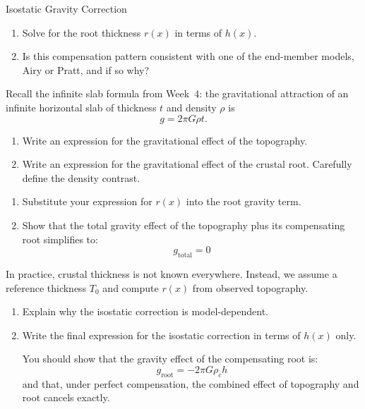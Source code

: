 \begin{activity}{Isostatic Gravity Correction}
\begin{questions}
\begin{enumerate}[label=\roman*]
        \item Solve for the root thickness $r(x)$ in terms of $h(x)$.
        \answerbox[3cm]

        \item Is this compensation pattern consistent with one of the end-member models, Airy or Pratt, and if so why?
        \answerbox[3cm]
    \end{enumerate}

    Recall the infinite slab formula from Week~4: the gravitational attraction of an infinite horizontal slab of thickness $t$ and density $\rho$ is
    \[
        g = 2\pi G \rho t .
    \]
    \begin{enumerate}[label=\roman*]
        \item Write an expression for the gravitational effect of the topography.
        \answerbox[3cm]

        \item Write an expression for the gravitational effect of the crustal root. Carefully define the density contrast.
        \answerbox[3cm]
    \end{enumerate}

    \begin{enumerate}[label=\roman*]
        \item Substitute your expression for $r(x)$ into the root gravity term.
        \answerbox[5cm]

        \item Show that the total gravity effect of the topography plus its compensating root simplifies to:
        \[
            g_{\text{total}} = 0
        \]
        \answerbox[5cm]
    \end{enumerate}

    In practice, crustal thickness is not known everywhere. Instead, we assume a reference thickness $T_0$ and compute $r(x)$ from observed topography.
    \begin{enumerate}[label=\roman*]
        \item Explain why the isostatic correction is model-dependent.
        \answerbox[3cm]

        \item Write the final expression for the isostatic correction in terms of $h(x)$ only.

        You should show that the gravity effect of the compensating root is:
        \[
            g_{\text{root}} = -2\pi G \rho_c h
        \]
        and that, under perfect compensation, the combined effect of topography and root cancels exactly.
        \answerbox[3cm]
    \end{enumerate}


\end{questions}
\end{activity}
